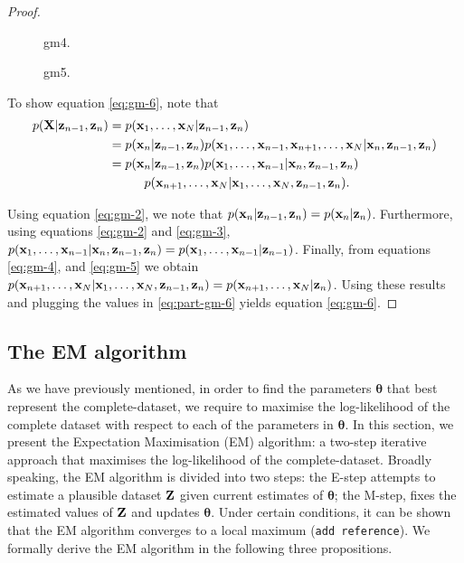 \documentclass[11pt]{article}
\numberwithin{equation}{section}
\newcommand{\x}{{\bf x}}
\newcommand{\X}{{\bf X}}
\newcommand{\z}{{\bf z}}
\newcommand{\Z}{{\bf Z}}
\begin{document}
\begin{proof}
	\begin{figure}[h!]
		\centering
		\resizebox{\columnwidth}{!}{}
		\caption{gm4.}
		\label{fig:gm-4}
	\end{figure}
	
	\begin{figure}[h!]
		\centering
		\resizebox{\columnwidth}{!}{}
		\caption{gm5.}
		\label{fig:gm-5}
	\end{figure}
	
	To show equation \eqref{eq:gm-6}, note that
	\begin{align}
		p(\X \vert \z_{n-1}, \z_n) &= p(\x_1, \ldots, \x_N \vert \z_{n-1},\z_n)\\
		 &= p(\x_n \vert \z_{n-1}, \z_n) p(\x_1, \ldots, \x_{n-1}, \x_{n+1}, \ldots, \x_N \vert \x_n, \z_{n-1}, \z_n)\\
		&= p(\x_n \vert \z_{n-1}, \z_n) p(\x_1, \ldots, \x_{n-1} \vert \x_n, \z_{n-1}, \z_n) \nonumber\\
			&\hspace{1cm} p(\x_{n+1}, \ldots, \x_N \vert \x_1, \ldots, \x_N, \z_{n-1}, \z_n). \label{eq:part-gm-6}
	\end{align}
	
	Using equation \eqref{eq:gm-2}, we note that $p(\x_n \vert \z_{n-1}, \z_n) = p(\x_n \vert \z_n)$. Furthermore, using equations \eqref{eq:gm-2} and \eqref{eq:gm-3}, $p(\x_1, \ldots, \x_{n-1} \vert \x_n, \z_{n-1}, \z_n) = p(\x_1, \ldots, \x_{n-1} \vert \z_{n-1})$. Finally, from equations \eqref{eq:gm-4}, and \eqref{eq:gm-5} we obtain  $p(\x_{n+1}, \ldots, \x_N \vert \x_1, \ldots, \x_N, \z_{n-1}, \z_n) = p(\x_{n+1}, \ldots, \x_N \vert  \z_{n})$. Using these results and plugging the values in \eqref{eq:part-gm-6} yields equation \eqref{eq:gm-6}.
\end{proof}


\subsection{The EM algorithm}

As we have previously mentioned, in order to find the parameters $\boldsymbol{\theta}$ that best represent the complete-dataset, we require to maximise the log-likelihood of the complete dataset with respect to each of the parameters in $\boldsymbol{\theta}$. In this section, we present the Expectation Maximisation (EM) algorithm: a two-step iterative approach that maximises the log-likelihood of the complete-dataset. Broadly speaking, the EM algorithm is divided into two steps: the E-step attempts to estimate a plausible dataset $\Z$ given current estimates of $\boldsymbol\theta$; the M-step, fixes the estimated values of $\Z$ and updates $\boldsymbol{\theta}$. Under certain conditions, it can be shown that the EM algorithm converges to a local maximum (\texttt{add reference}). We formally derive the EM algorithm in the following three propositions.
\end{document}
